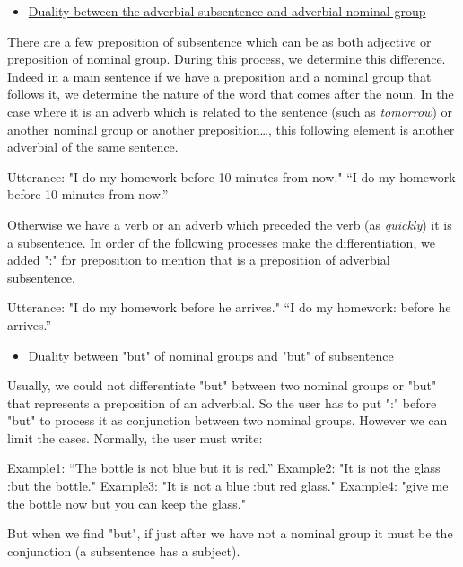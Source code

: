 \documentclass[twoside,a4paper,10pt]{report}
\begin{document}
\begin{itemize}
    \item  \underline{Duality between the adverbial subsentence and adverbial nominal group}
\end{itemize}
There are a few preposition of subsentence which can be as both adjective or preposition of nominal group. During this process, we determine this difference. Indeed in a main sentence if we have a preposition and a nominal group that follows it, we determine the nature of the word that comes after the noun. In the case where it is an adverb which is related to the sentence (such as \textsl{tomorrow}) or another nominal group or another preposition…, this following element is another adverbial of the same sentence. 


\small
\begin{verbatimtab}
  Utterance: "I do my homework before 10 minutes from now."
  “I do my homework before 10 minutes from now.”
\end{verbatimtab}
\normalsize
Otherwise we have a verb or an adverb which preceded the verb (as \textsl{quickly}) it is a subsentence. In order of the following processes make the differentiation, we added ":" for preposition to mention that is a preposition of adverbial subsentence.


\small
\begin{verbatimtab}
  Utterance: "I do my homework before he arrives."
  “I do my homework: before he arrives.”
\end{verbatimtab}
\normalsize

\begin{itemize}
    \item  \underline{Duality between "but" of nominal groups and "but" of subsentence}
\end{itemize}
Usually, we could not differentiate "but" between two nominal groups or "but" that represents a preposition of an adverbial. So the user has to put ":" before "but" to process it as conjunction between two nominal groups. However we can limit the cases. Normally, the user must write:


\small
\begin{verbatimtab}
  Example1: “The bottle is not blue but it is red.” 
  Example2: "It is not the glass :but the bottle."
  Example3: "It is not a blue :but red glass."
  Example4: "give me the bottle now but you can keep the glass."
\end{verbatimtab}
\normalsize
But when we find "but", if just after we have not a nominal group it must be the conjunction (a subsentence has a subject). 
\end{document}
